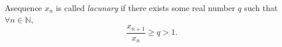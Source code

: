 \documentclass[12pt]{article}
\begin{document}
\begin{definition}
  Asequence $x_n$ is called \emph{lacunary} if there exists some real number $q$ such that $\forall n \in \mathbb{N}$, \[
    \frac{x_{n+1}}{x_n} \geq q > 1.
  \]
\end{definition}




\end{document}
